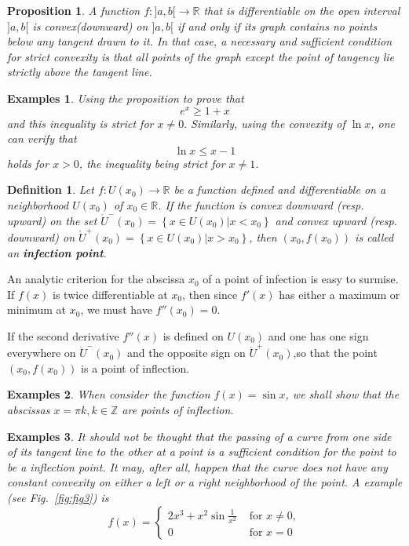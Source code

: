 \documentclass[a4paper,12pt]{article} %
\newtheorem{definition}{Definition}[section]
\newtheorem{proposition}{Proposition}[section]
\newtheorem{example}{Examples}
\begin{document}
\begin{proposition}
    \normalfont
    A function $f: ]a,b[ \to \mathbb{R} $ that is differentiable on the open 
    interval $]a,b[$ is convex(downward) on $]a,b[$ if and only if its graph
    contains no points below any tangent drawn to it. In that case, a 
    necessary and sufficient condition for strict convexity is that all
    points of the graph except the point of tangency lie strictly above 
    the tangent line.
\end{proposition}

\begin{example}
    \normalfont
    Using the proposition to prove that 
    \[
        e^x \ge 1 + x 
        \]
    and this inequality is strict for $x \ne 0.$
    Similarly, using the convexity of $\ln x$, one can verify that 
    \[
        \ln x \le x - 1
        \]
    holds for $x > 0$, the inequality being strict for $x \ne 1$.
\end{example}

\begin{definition}
    \normalfont 
    Let $f: U(x_0) \to \mathbb{R}$ be a function defined and differentiable 
    on a neighborhood $U(x_0)$ of $x_0 \in \mathbb{R}$. If the function is 
    convex downward (resp. upward) on the set $\mathring{U}^-(x_0) =  
    \left\{x \in U(x_0) \vert x < x_0\right\}$ and convex upward (resp. downward)
    on $\mathring{U}^+(x_0) = \left\{x\in U(x_0) \vert x > x_0\right\} $, then $\left(x_0, f(x_0)\right)$
    is called an \textbf{infection point}.
\end{definition}

An analytic criterion for the abscissa $x_0$ of a point of infection 
is easy to surmise. If $f(x)$ is twice differentiable at $x_0$, then 
since $f'(x)$ has either a maximum or minimum at $x_0$, we must have $f''(x_0) = 0$.

If the second derivative $f''(x)$ is defined on $U(x_0)$ and one has 
one sign everywhere on $\mathring{U}^-(x_0)$ and the opposite sign on 
$\mathring{U}^+(x_0)$,so that the point $\left(x_0,f(x_0)\right)$ is a point of inflection.

\begin{example}
    When consider the function $f(x) = \sin x$, we shall show that 
    the abscissas $x = \pi k, k \in \mathbb{Z}$ are points of inflection.
\end{example}

\begin{example}
    \normalfont
    It should not be thought that the passing of a curve from one side 
    of its tangent line to the other at a point is a sufficient condition 
    for the point to be a inflection point. It may, after all, happen 
    that the curve does not have any constant convexity on either a 
    left or a right neighborhood of the point. A example (see Fig.~\ref{fig:fig3}) is 
    \[
        f(x) = \left\{\begin{array}{cl} 2x^3 + x^2\sin \frac{1}{x^2} & \text{ for } 
            x \ne 0, \\ 0 & \text{ for } x = 0 
        \end{array} \right.
        \]
    \label{ex:ex2}
\end{example}
\end{document}
